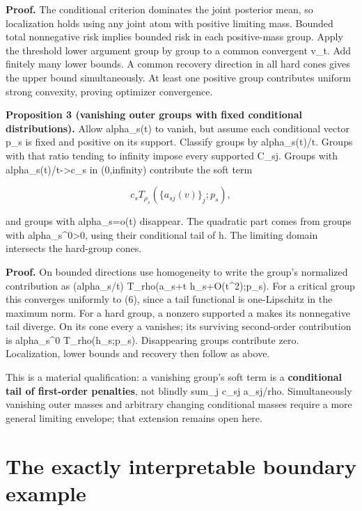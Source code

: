 \documentclass[10pt]{article}
\begin{document}
\textbf{Proof.} The conditional criterion dominates the joint posterior mean, so localization holds using any joint atom with positive limiting mass. Bounded total nonnegative risk implies bounded risk in each positive-mass group. Apply the threshold lower argument group by group to a common convergent v\_t. Add finitely many lower bounds. A common recovery direction in all hard cones gives the upper bound simultaneously. At least one positive group contributes uniform strong convexity, proving optimizer convergence.

\textbf{Proposition 3 (vanishing outer groups with fixed conditional distributions).} Allow alpha\_s(t) to vanish, but assume each conditional vector p\_s is fixed and positive on its support. Classify groups by alpha\_s(t)/t. Groups with that ratio tending to infinity impose every supported C\_sj. Groups with alpha\_s(t)/t->c\_s in (0,infinity) contribute the soft term

\begin{equation}
c_s T_{\rho_s}(\{a_{sj}(v)\}_j;p_s),\tag{6}
\end{equation}



and groups with alpha\_s=o(t) disappear. The quadratic part comes from groups with alpha\_s\textasciicircum{}0>0, using their conditional tail of h. The limiting domain intersects the hard-group cones.

\textbf{Proof.} On bounded directions use homogeneity to write the group's normalized contribution as (alpha\_s/t) T\_rho(a\_s+t h\_s+O(t\textasciicircum{}2);p\_s). For a critical group this converges uniformly to (6), since a tail functional is one-Lipschitz in the maximum norm. For a hard group, a nonzero supported a makes its nonnegative tail diverge. On its cone every a vanishes; its surviving second-order contribution is alpha\_s\textasciicircum{}0 T\_rho(h\_s;p\_s). Disappearing groups contribute zero. Localization, lower bounds and recovery then follow as above.

This is a material qualification: a vanishing group's soft term is a \textbf{conditional tail of first-order penalties}, not blindly sum\_j c\_sj a\_sj/rho. Simultaneously vanishing outer masses and arbitrary changing conditional masses require a more general limiting envelope; that extension remains open here.

\section{The exactly interpretable boundary example}
\end{document}
